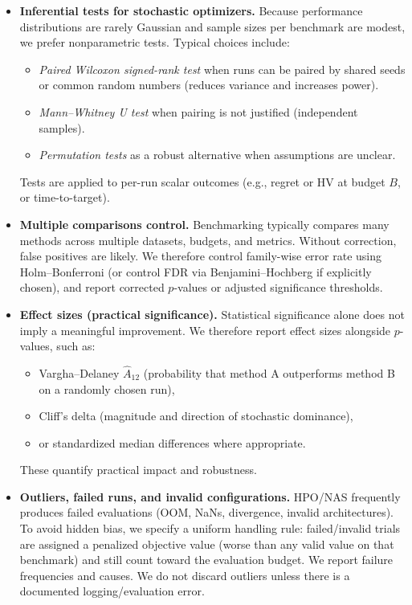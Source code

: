 \begin{itemize}
    \item \textbf{Inferential tests for stochastic optimizers.}
    Because performance distributions are rarely Gaussian and sample sizes per benchmark are modest, we prefer nonparametric tests.
    Typical choices include:
    \begin{itemize}
        \item \emph{Paired Wilcoxon signed-rank test} when runs can be paired by shared seeds or common random numbers
        (reduces variance and increases power).
        \item \emph{Mann--Whitney U test} when pairing is not justified (independent samples).
        \item \emph{Permutation tests} as a robust alternative when assumptions are unclear.
    \end{itemize}
    Tests are applied to per-run scalar outcomes (e.g., regret or HV at budget \(B\), or time-to-target).

    \item \textbf{Multiple comparisons control.}
    Benchmarking typically compares many methods across multiple datasets, budgets, and metrics.
    Without correction, false positives are likely.
    We therefore control family-wise error rate using Holm--Bonferroni (or control FDR via Benjamini--Hochberg if explicitly chosen),
    and report corrected \(p\)-values or adjusted significance thresholds.

    \item \textbf{Effect sizes (practical significance).}
    Statistical significance alone does not imply a meaningful improvement.
    We therefore report effect sizes alongside \(p\)-values, such as:
    \begin{itemize}
        \item Vargha--Delaney \(\hat{A}_{12}\) (probability that method A outperforms method B on a randomly chosen run),
        \item Cliff's delta (magnitude and direction of stochastic dominance),
        \item or standardized median differences where appropriate.
    \end{itemize}
    These quantify practical impact and robustness.

    \item \textbf{Outliers, failed runs, and invalid configurations.}
    HPO/NAS frequently produces failed evaluations (OOM, NaNs, divergence, invalid architectures).
    To avoid hidden bias, we specify a uniform handling rule:
    failed/invalid trials are assigned a penalized objective value (worse than any valid value on that benchmark)
    and still count toward the evaluation budget.
    We report failure frequencies and causes. We do not discard outliers unless there is a documented logging/evaluation error.


\end{itemize}
